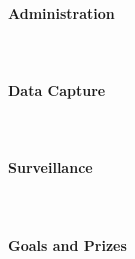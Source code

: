 \paragraph{Administration}\mbox{}\\

\paragraph{Data Capture}\mbox{}\\

\paragraph{Surveillance}\mbox{}\\

\paragraph{Goals and Prizes}\mbox{}\\


